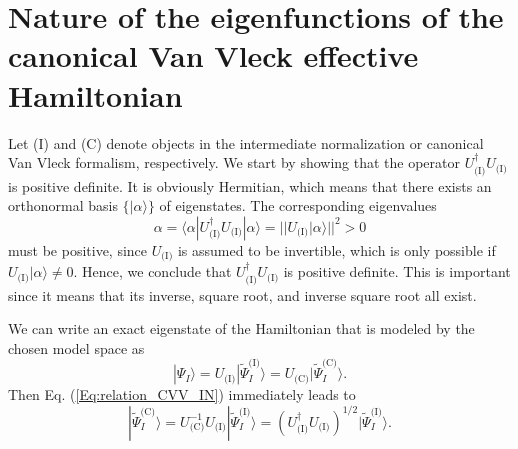 \section{Nature of the eigenfunctions of the canonical Van Vleck effective Hamiltonian}
\label{Ap:CVV_IN}
Let (I) and (C) denote objects in the intermediate normalization or canonical Van Vleck formalism, respectively. We start by showing that the operator $U_\text{(I)}^\dag {U_\text{(I)}}$ is positive definite. It is obviously Hermitian, which means that there exists an orthonormal basis $\{ |\alpha \rangle \} $ of eigenstates. The corresponding eigenvalues
	\begin{equation}
	\alpha  = \langle \alpha |U_\text{(I)}^\dag {U_\text{(I)}}|\alpha \rangle  = ||{U_\text{(I)}}|\alpha\rangle |{|^2} > 0
	\end{equation} 	
must be positive, since ${U_\text{(I)}}$ is assumed to be invertible, which is only possible if ${U_\text{(I)}}|\alpha \rangle  \ne 0$. Hence, we conclude that $U_\text{(I)}^\dag {U_\text{(I)}}$ is positive definite. This is important since it means that its inverse, square root, and inverse square root all exist.

We can write an exact eigenstate of the Hamiltonian that is modeled by the chosen model space as
\begin{equation}
|\Psi_I\rangle = U_\text{(I)} |\tilde{\Psi}_I^\text{(I)}\rangle = U_\text{(C)} |\tilde{\Psi}_I^\text{(C)}\rangle.
\end{equation}
Then Eq. (\ref{Eq:relation_CVV_IN}) immediately leads to
	\begin{equation}
	\label{Eq:old54}
	|\tilde \Psi _I^\text{(C)}\rangle  = U_\text{(C)}^{-1}{U_\text{(I)}}|\tilde \Psi_I^\text{(I)}\rangle = {(U_\text{(I)}^\dag {U_\text{(I)}})^{1/2}}|\tilde \Psi _I^\text{(I)}\rangle. 
	\end{equation} 	

